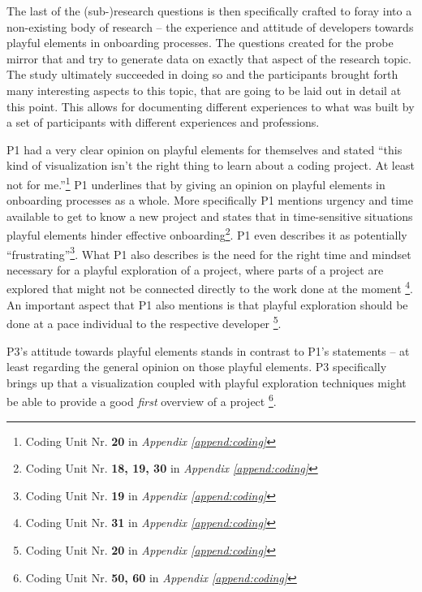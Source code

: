 The last of the (sub-)research questions is then specifically crafted to foray into a non-existing body of research -- the experience and attitude of developers towards playful elements in onboarding processes. The questions created for the probe mirror that and try to generate data on exactly that aspect of the research topic. The study ultimately succeeded in doing so and the participants brought forth many interesting aspects to this topic, that are going to be laid out in detail at this point. This allows for documenting different experiences to what was built by a set of participants with different experiences and professions.

P1 had a very clear opinion on playful elements for themselves and stated \enquote{this kind of visualization isn't the right thing to learn about a coding project. At least not for me.}\footnote{Coding Unit Nr. \textbf{20} in \textit{Appendix \ref{append:coding}}} P1 underlines that by giving an opinion on playful elements in onboarding processes as a whole. More specifically P1 mentions urgency and time available to get to know a new project and states that in time-sensitive situations playful elements hinder effective onboarding\footnote{Coding Unit Nr. \textbf{18, 19, 30} in \textit{Appendix \ref{append:coding}}}. P1 even describes it as potentially \enquote{frustrating}\footnote{Coding Unit Nr. \textbf{19} in \textit{Appendix \ref{append:coding}}}. What P1 also describes is the need for the right time and mindset necessary for a playful exploration of a project, where parts of a project are explored that might not be connected directly to the work done at the moment \footnote{Coding Unit Nr. \textbf{31} in \textit{Appendix \ref{append:coding}}}. An important aspect that P1 also mentions is that playful exploration should be done at a pace individual to the respective developer \footnote{Coding Unit Nr. \textbf{20} in \textit{Appendix \ref{append:coding}}}.

P3's attitude towards playful elements stands in contrast to P1's statements -- at least regarding the general opinion on those playful elements. P3 specifically brings up that a visualization coupled with playful exploration techniques might be able to provide a good \textit{first} overview of a project \footnote{Coding Unit Nr. \textbf{50, 60} in \textit{Appendix \ref{append:coding}}}.

